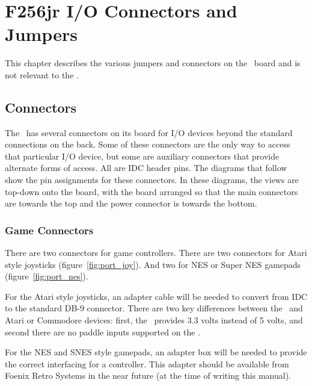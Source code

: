 \chapter{F256jr I/O Connectors and Jumpers}

\begin{note}
    This chapter describes the various jumpers and connectors on the \fjr\ board and is not relevant to the \fk.    
\end{note}

\section*{Connectors}

The \fjr\ has several connectors on its board for I/O devices beyond the standard connections on the back. Some of these connectors are the only way to access that particular I/O device, but some are auxiliary connectors that provide alternate forms of access. All are IDC header pins. The diagrams that follow show the pin assignments for these connectors. In these diagrams, the views are top-down onto the board, with the board arranged so that the main connectors are towards the top and the power connector is towards the bottom.

\subsection*{Game Connectors}

There are two connectors for game controllers. There are two connectors for Atari style joysticks (figure~\ref{fig:port_joy}). And two for NES or Super NES gamepads (figure~\ref{fig:port_nes}).

For the Atari style joysticks, an adapter cable will be needed to convert from IDC to the standard DB-9 connector. There are two key differences between the \fjr\ and Atari or Commodore devices: first, the \fjr\ provides 3.3 volts instead of 5 volts, and second there are no paddle inputs supported on the \fjr.

For the NES and SNES style gamepads, an adapter box will be needed to provide the correct interfacing for a controller. This adapter should be available from Foenix Retro Systems in the near future (at the time of writing this manual).

